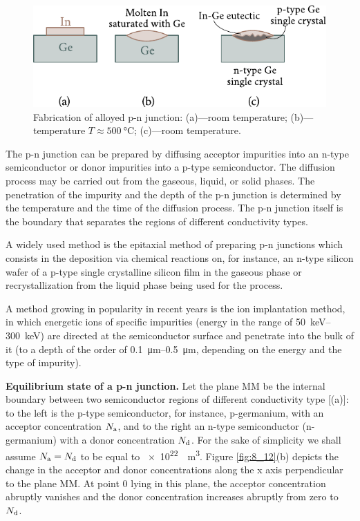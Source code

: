 \begin{figure}[t]
	\begin{center}
		\includegraphics[scale=1]{figures/ch_08/fig_8_11.pdf}
		\caption[]{Fabrication of alloyed p-n junction: (a)---room temperature; (b)---temperature $T\approx\SI{500}{\degreeCelsius}$; (c)---room temperature.}
		\label{fig:8_11}
	\end{center}
	\vspace{-0.8cm}
\end{figure}

The p-n junction can be prepared by diffusing acceptor impurities into an n-type semiconductor or donor impurities into a p-type semiconductor. The diffusion process may be carried out from the
gaseous, liquid, or solid phases. The penetration of the impurity and the depth of the p-n junction is determined by the temperature and the time of the diffusion process. The p-n junction itself is the boundary that separates the regions of different conductivity types.

A widely used method is the epitaxial method of preparing p-n junctions which consists in the deposition via chemical reactions on, for instance, an n-type silicon wafer of a p-type single crystalline silicon film in the gaseous phase or recrystallization from the liquid phase being used for the process.

A method growing in popularity in recent years is the ion implantation method, in which energetic ions of specific impurities (energy in the range of \SIrange{50}{300}{\kilo\electronvolt}) are directed at the semiconductor surface and penetrate into the bulk of it (to a depth of the order of \SIrange{0.1}{0.5}{\micro\metre}, depending on the energy and the type of impurity).

\textbf{Equilibrium state of a p-n junction.} Let the plane MM be the internal boundary between two semiconductor regions of different conductivity type [(a)]: to the left is the p-type semiconductor, for instance, p-germanium, with an acceptor concentration $N_{\text{a}}$, and to the right an n-type semiconductor (n-germanium) with a donor concentration $N_{\text{d}}$. For the sake of simplicity we shall assume $N_{\text{a}}=N_{\text{d}}$ to be equal to \SI{e22}{\per\metre\cubed}. Figure \ref{fig:8_12}(b) depicts the change in the acceptor and donor concentrations along the x axis perpendicular to the plane MM. At point $0$ lying in this plane, the acceptor concentration abruptly vanishes and the donor concentration increases abruptly from zero to $N_{\text{d}}$.


